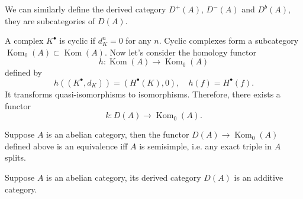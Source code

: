 We can similarly define the derived category $D^+(A)$, $D^-(A)$ and 
$D^b(A)$, they are subcategories of $D(A)$.

\begin{para}
	A complex $K^\bullet$ is cyclic if $d_K^n=0$ for any $n$. 
	Cyclic complexes form a subcategory $\operatorname{Kom}_0(A)
	\subset \operatorname{Kom}(A)$. Now let's consider the 
	homology functor
	\[
		h:\operatorname{Kom}(A)\to \operatorname{Kom}_0(A)
	\]
	defined by 
	\[
		h((K^\bullet,d_K))=(H^\bullet(K),0),\quad 
		h(f)=H^\bullet(f).
	\]
	It transforms quasi-isomorphisms to isomorphisms. Therefore,
	there exists a functor 
	\[
		k:D(A)\to \operatorname{Kom}_0(A).
	\]
\end{para}

\begin{pro}
	Suppose $A$ is an abelian category, then 
	the functor $D(A)\to \operatorname{Kom}_0(A)$ defined above is 
	an equivalence iff $A$ is semisimple, i.e. any exact triple 
	in $A$ splits.
\end{pro}

\begin{thm}
	Suppose $A$ is an abelian category, its derived category $D(A)$
	is an additive category.
\end{thm}